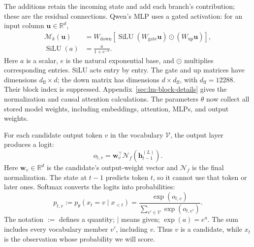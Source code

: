\documentclass[12pt]{report}
\begin{document}
The additions retain the incoming state and add each branch's contribution;
these are the residual connections. Qwen's MLP uses a gated activation:
for an input column $\mathbf u\in\mathbb R^d$,
\begin{equation}
\begin{aligned}
\mathcal M_k(\mathbf u)
 &=W_{\mathrm{down}}
   \left[\operatorname{SiLU}(W_{\mathrm{gate}}\mathbf u)
                    \odot(W_{\mathrm{up}}\mathbf u)\right],\\
\operatorname{SiLU}(a)&=\frac{a}{1+e^{-a}}.
\end{aligned}
\label{eq:lm-gated-mlp}
\end{equation}
Here $a$ is a scalar, $e$ is the natural exponential base, and $\odot$
multiplies corresponding entries. SiLU acts entry by entry.
The gate and up matrices have dimensions $d_{\mathrm{ff}}\times d$;
the down matrix has dimensions $d\times d_{\mathrm{ff}}$, with
$d_{\mathrm{ff}}=12288$. Their block index is suppressed.
Appendix~\ref{sec:lm-block-details} gives the normalization and causal
attention calculations. The parameters $\theta$ now collect all stored
model weights, including embeddings, attention, MLPs, and output weights.

For each candidate output token $v$ in the vocabulary $\mathcal V$,
the output layer produces a logit:
\begin{equation}
o_{t,v}=\mathbf w_v^\top
              \mathcal N_f(\mathbf h_{t-1}^{(L)}).
\label{eq:lm-logit}
\end{equation}
Here $\mathbf w_v\in\mathbb R^d$ is the candidate's output-weight vector
and $\mathcal N_f$ is the final normalization. The state at $t-1$
predicts token $t$, so it cannot use that token or later ones.
Softmax converts the logits into probabilities:
\begin{equation}
p_{t,v}
 :=p_\theta(x_t=v\mid x_{<t})
 =\frac{\exp(o_{t,v})}{\sum_{v'\in\mathcal V}\exp(o_{t,v'})}.
\label{eq:softmax}
\end{equation}
The notation $:=$ defines a quantity; $\mid$ means given; $\exp(a)=e^a$.
The sum includes every vocabulary member $v'$, including $v$.
Thus $v$ is a candidate, while $x_t$ is the observation whose probability
we will score.
\end{document}
